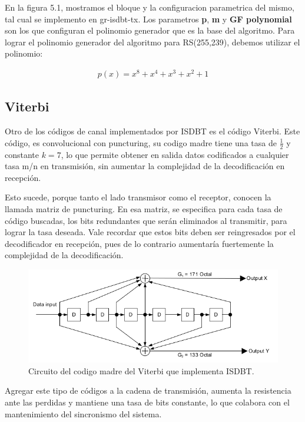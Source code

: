 En la figura 5.1, mostramos el bloque y la configuracion parametrica del mismo, tal cual se implemento en gr-isdbt-tx. Los parametros \textbf{p}, \textbf{m} y \textbf{GF polynomial} son los que configuran el polinomio generador que es la base del algoritmo. Para lograr el polinomio generador del algoritmo para RS(255,239), debemos utilizar el polinomio:

\begin{gather*}
	p(x) = x^8 + x^4 + x^3 + x^2 + 1
\end{gather*}

	\subsection{Viterbi}
	Otro de los códigos de canal implementados por ISDBT es el código Viterbi. Este código, es  convolucional con puncturing, su codigo madre tiene una tasa de $\frac{1}{2}$ y constante $k = 7$, lo que permite obtener en salida datos codificados a cualquier tasa m/n en transmisión, sin aumentar la complejidad de la decodificación en recepción. 
	
	Esto sucede, porque tanto el lado transmisor como el receptor, conocen la llamada matriz de puncturing. En esa matriz, se especifica para cada tasa de código buscadas, los bits redundantes que serán eliminados al transmitir, para lograr la tasa deseada. Vale recordar que estos bits deben ser reingresados por el decodificador en recepción, pues de lo contrario aumentaría fuertemente la complejidad de la decodificación.
	
	\begin{figure}[h!]
		\centering
		\includegraphics[scale=0.5]{figuras/cap05/viterbi}
		\caption{\label{f:viterbi} Circuito del codigo madre del Viterbi que implementa ISDBT.}
	\end{figure}
	
	Agregar este tipo de códigos a la cadena de transmisión, aumenta la resistencia ante las perdidas y mantiene una tasa de bits constante, lo que colabora con el mantenimiento del sincronismo del sistema.
	
